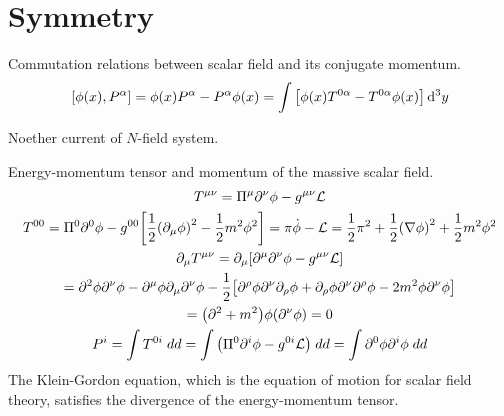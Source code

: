 \documentclass{report}
\begin{document}
\chapter{Symmetry}

\begin{subquests}
	\item Commutation relations between scalar field and its conjugate momentum.
	\begin{gather*}
		\bqty{\phi(x),P^{\alpha}} = \phi(x)P^{\alpha} - P^{\alpha}\phi(x) =  \int \bqty{\phi(x) T^{0\alpha} - T^{0\alpha}\phi(x)}\,\dd^3{y}
	\end{gather*}

	\item Noether current of $N$-field system.

	\item Energy-momentum tensor and momentum of the massive scalar field.
	\begin{gather*}
		T^{\mu\nu} = \Pi^{\mu}\partial^{\nu}\phi - g^{\mu\nu}\cal{L} \\
		T^{00} = \Pi^{0}\partial^{0}\phi - g^{00}\bqty{\frac{1}{2}\pqty{\partial_{\mu}\phi}^2 - \frac{1}{2}m^2\phi^2} = \pi\dot{\phi} - \mathcal L = \frac{1}{2}\pi^2 + \frac{1}{2}\pqty{\nabla{\phi}}^2 + \frac{1}{2}m^2\phi^2 \\
		\partial_{\mu}T^{\mu\nu} = \partial_{\mu}\bqty{\partial^{\mu}\partial^{\nu}\phi - g^{\mu\nu}\cal{L}} \\
		= \partial^2\phi\partial^{\nu}\phi - \partial^{\mu}\phi\partial_{\mu}\partial^{\nu}\phi - \frac{1}{2}\bqty{\partial^{\rho}\phi \partial^{\nu}\partial_{\rho}\phi+ \partial_{\rho}\phi\partial^{\nu}\partial^{\rho}\phi - 2m^2\phi\partial^{\nu}\phi} \\
		= \pqty{\partial^2 + m^2}\phi\pqty{\partial^{\nu}\phi} = 0 \\
		P^i = \int T^{0i}\;dd = \int \pqty{\Pi^0\partial^i \phi - g^{0i}\cal{L}}\;dd = \int \partial^0\phi\partial^i\phi\;dd
	\end{gather*}
	The Klein-Gordon equation, which is the equation of motion for scalar field theory, satisfies the divergence of the energy-momentum tensor.


\end{subquests}
\end{document}
